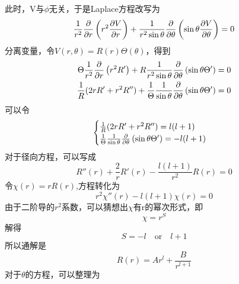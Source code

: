 \documentclass[14pt,oneside]{book}
\begin{document}
\begin{large}
\begin{enumerate}
  此时，V与$\phi$无关，于是Laplace方程改写为
  \begin{equation}
  \frac{1}{r^2}\pdv{}{r}\left(r^2\pdv{V}{r}\right) +\frac{1}{r^2\sin\theta}\pdv{}{\theta }\left(\sin\theta\pdv{V}{\theta}\right)=0
\end{equation}
分离变量，令$V(r,\theta)=R(r)\Theta(\theta)$，得到
\begin{equation}
\begin{aligned}
 \Theta \frac{1}{r^2}\pdv{}{r}\left(r^2R'\right)+R\frac{1}{r^2\sin\theta}\pdv{}{\theta }\left(\sin\theta\Theta'\right)=0\\
 \frac{1}{R}(2rR'+r^2R'')+\frac{1}{\Theta}\frac{1}{\sin \theta}\pdv{}{\theta }\left(\sin\theta\Theta'\right)=0
\end{aligned}
\end{equation}
可以令
\begin{align}
\begin{cases}
	\frac{1}{R}(2rR'+r^2R'')=l(l+1)\\
	\frac{1}{\Theta}\frac{1}{\sin \theta}\pdv{}{\theta }\left(\sin\theta\Theta'\right)=-l(l+1)
\end{cases}
\end{align}
对于径向方程，可以写成
	\begin{equation}
     R''(r)+\frac{2}{r} R'(r)-\frac{l(l+1)}{r^2}R(r)=0
	\end{equation}
	令$\chi(r)=rR(r)$,方程转化为
	\begin{equation}
  r^2\chi''(r)-l(l+1)\chi(r)=0
\end{equation}
由于二阶导的$r^2$系数，可以猜想出$\chi$有r的幂次形式，即
\begin{equation}
  \chi=r^S
\end{equation}
解得
\begin{equation}
  S=-l\quad  \text{or}\quad l+1
\end{equation}
所以通解是
\begin{equation}
  R(r)=Ar^l+\frac{B}{r^{l+1}}
\end{equation}
对于$\theta$的方程，可以整理为


\end{enumerate}
\end{large}
\end{document}

